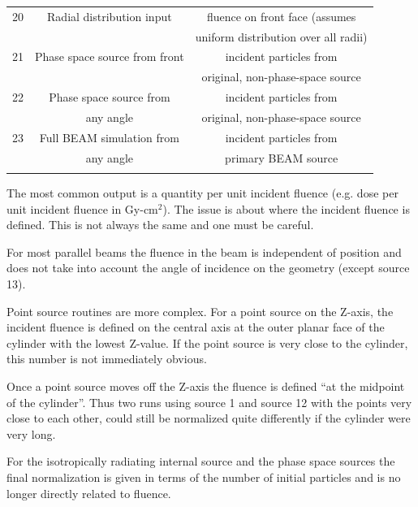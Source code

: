 \documentclass[12pt,twoside]{article}  %
\begin{document}
\begin{htmlonly}
\begin{table}[htb]
\begin{tabular}{|lcc|}
\hline
20 & Radial distribution input & fluence on front face (assumes\\
   &                           & uniform distribution over all radii)\\
\hline
21 & Phase space source from front & incident particles from\\
   &                               & original, non-phase-space source\\
\hline
22 & Phase space source from   & incident particles from\\
   & any angle  & original, non-phase-space source\\ 
\hline
23 & Full BEAM simulation from   & incident particles from\\
   & any angle  & primary BEAM source\\
\label{normtable}
\end{tabular}
\end{table}
\end{htmlonly}

The most common output is a quantity per unit incident fluence (e.g. dose
per  unit incident fluence in Gy-cm$^2$).  The issue is about where the
incident fluence is defined.  This is not always the same and one must be
careful.

For most parallel beams the fluence in the beam is independent of position
and does not take into account the angle of incidence on the geometry
(except source 13).

Point source routines are more complex.  For a point source on the Z-axis,
the incident fluence is defined on the central axis 
at the outer planar face of the cylinder
with the lowest Z-value.  If the point source is very close to the
cylinder, this number is not immediately obvious.

Once a point source moves off the Z-axis the fluence is defined ``at the
midpoint of the cylinder''.  Thus two runs using source 1 and source 12
with the points very close to each other, could still be normalized quite
differently if the cylinder were very long.

For the isotropically radiating internal source and the phase space sources 
the final
normalization is given in terms of the number of initial particles and is
no longer directly related to fluence.

\renewcommand{\leftmark}{{DOSRZnrc}}
\end{document}
